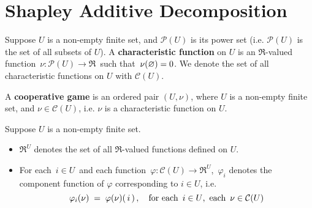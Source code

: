 

\section{Shapley Additive Decomposition}
\setcounter{theorem}{0}
\setcounter{equation}{0}


\renewcommand{\theenumi}{\roman{enumi}}
\renewcommand{\labelenumi}{\textnormal{(\theenumi)}$\;\;$}


\begin{definition}
\mbox{}
\vskip 0.1cm
\noindent
Suppose $U$ is a non-empty finite set, and
$\mathcal{P}(U)$ is its power set
(i.e. $\mathcal{P}(U)$ is the set of all subsets of $U$).
A \textbf{characteristic function} on $U$ is an $\Re$-valued function
\,$\nu : \mathcal{P}(U) \longrightarrow \Re$\,
such that \,$\nu(\varnothing) = 0$.
We denote the set of all characteristic functions on $U$ with $\mathcal{C}(U)$.
\end{definition}

\begin{definition}
\mbox{}
\vskip 0.1cm
\noindent
A \textbf{cooperative game} is an ordered pair $(U,\nu)$,
where $U$ is a non-empty finite set, and $\nu \in \mathcal{C}(U)$,
i.e. $\nu$ is a characteristic function on $U$.
\end{definition}

\begin{notation}
\mbox{}
\vskip 0.1cm
\noindent
Suppose $U$ is a non-empty finite set.
\begin{itemize}
\item
	$\Re^{U}$ denotes the set of all $\Re$-valued functions defined on $U$.
\item
	For each \,$i \in U$\, and each function
	\,$\varphi : \mathcal{C}(U) \longrightarrow \Re^{U}$,\,
	$\varphi_{i}$ denotes the component function of $\varphi$ corresponding to $i \in U$, i.e.
	\begin{equation*}
	\varphi_{i}(\nu) \; = \; \varphi(\nu)(\,i\,)\,,
	\quad
	\textnormal{for each \,$i \in U$,\, each \,$\nu \in \mathcal{C}(U)$}
	\end{equation*}
\end{itemize}
\end{notation}

